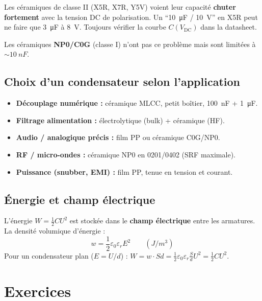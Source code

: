 \documentclass[12pt,a4paper,twoside]{book}
\begin{document}
\begin{attention}
Les céramiques de classe II (X5R, X7R, Y5V) voient leur capacité \textbf{chuter fortement} avec la tension DC de polarisation. Un ``\SI{10}{\micro F} / \SI{10}{V}'' en X5R peut ne faire que \SI{3}{\micro F} à \SI{8}{V}. Toujours vérifier la courbe $C(V_{\text{DC}})$ dans la datasheet.

Les céramiques \textbf{NP0/C0G} (classe I) n'ont pas ce problème mais sont limitées à $\sim\SI{10}{nF}$.
\end{attention}

\subsection{Choix d'un condensateur selon l'application}

\begin{pratique}
\begin{itemize}[nosep]
\item \textbf{Découplage numérique :} céramique MLCC, petit boîtier, \SI{100}{nF} + \SI{1}{\micro F}.
\item \textbf{Filtrage alimentation :} électrolytique (bulk) + céramique (HF).
\item \textbf{Audio / analogique précis :} film PP ou céramique C0G/NP0.
\item \textbf{RF / micro-ondes :} céramique NP0 en 0201/0402 (SRF maximale).
\item \textbf{Puissance (snubber, EMI) :} film PP, tenue en tension et courant.
\end{itemize}
\end{pratique}

\subsection{Énergie et champ électrique}

L'énergie $W = \frac{1}{2}CU^2$ est stockée dans le \textbf{champ électrique} entre les armatures. La densité volumique d'énergie :
\[
w = \frac{1}{2}\varepsilon_0\varepsilon_r E^2 \qquad (\si{J/m^3})
\]
Pour un condensateur plan ($E = U/d$) : $W = w \cdot Sd = \frac{1}{2}\varepsilon_0\varepsilon_r\frac{S}{d}U^2 = \frac{1}{2}CU^2$. \checkmark

\section*{Exercices}
\end{document}
